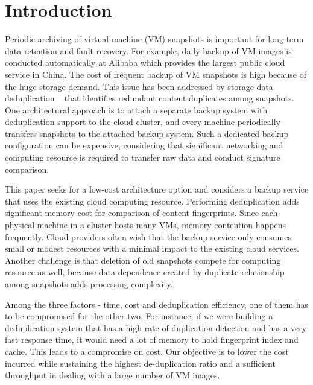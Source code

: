 \section{Introduction}
\label{sect:intro}


Periodic  archiving of virtual machine (VM) snapshots is important 
for long-term data  retention and fault recovery. 
For example, daily backup of VM images  is conducted automatically 
at Alibaba which provides the largest public cloud service in China.
The cost of frequent backup of VM snapshots is  high because of the huge storage demand.
This issue has been addressed by   storage data deduplication ~\cite{venti02,bottleneck08} that
identifies redundant content duplicates among snapshots.  
One architectural approach is to attach  a separate backup system with deduplication
support to the cloud cluster, and  every machine periodically transfers snapshots to
the attached backup system.  Such a dedicated backup  configuration can be expensive, 
considering that significant networking  and computing resource  is required to transfer 
raw data and conduct signature comparison. 


This paper seeks for a low-cost architecture option and considers a backup
service that uses the existing cloud computing resource.
Performing deduplication adds significant  memory cost for comparison of content fingerprints. 
Since each physical machine in a cluster  hosts many VMs, memory contention happens frequently. 
Cloud providers often wish that the backup service only consumes  small or modest resources 
with a minimal impact to the existing cloud services.  Another challenge is 
that deletion of old snapshots compete for computing resource as well, because data dependence created 
by duplicate relationship among snapshots  adds processing complexity.

Among the three factors - time, cost and deduplication efficiency, one of them has to be compromised for the other two. For instance, if we were building a deduplication system that has a high rate of duplication detection and has a very fast response time, 
it would need a lot of memory to hold fingerprint index and cache.  This leads to a compromise on cost. 
Our objective is to lower the cost incurred while sustaining the highest de-duplication ratio
and  a sufficient throughput in dealing with a large number of VM images. 

